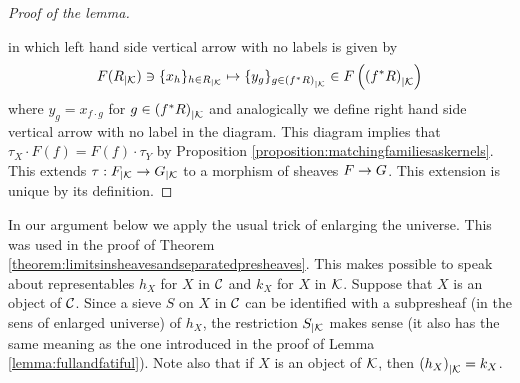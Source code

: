 \begin{proof}[Proof of the lemma]
\begin{center}
\end{center}
in which left hand side vertical arrow with no labels is given by
$$F(R_{\mid {\mathcal K}})\ni \{x_h\}_{h\in R_{\mid {\mathcal K}}}\mapsto \{y_g\}_{g\in \left(f^*R\right)_{\mid {\mathcal K}}} \in F\left(\left(f^*R\right)_{\mid {\mathcal K}}\right)$$
where $y_g = x_{f\cdot g}$ for $g\in \left(f^*R\right)_{\mid {\mathcal K}}$ and analogically we define right hand side vertical arrow with no label in the diagram. This diagram implies that $\tau_X\cdot F(f) = F(f)\cdot \tau_Y$ by Proposition \ref{proposition:matchingfamiliesaskernels}. This extends $\tau:F_{\mid {\mathcal K}}\rightarrow G_{\mid {\mathcal K}}$ to a morphism of sheaves $F\rightarrow G$. This extension is unique by its definition.
\end{proof}
\noindent
In our argument below we apply the usual trick of enlarging the universe. This was used in the proof of Theorem \ref{theorem:limitsinsheavesandseparatedpresheaves}. This makes possible to speak about representables $h_X$ for $X$ in ${\mathcal C}$ and $k_X$ for $X$ in ${\mathcal K}$. Suppose that $X$ is an object of ${\mathcal C}$. Since a sieve $S$ on $X$ in ${\mathcal C}$ can be identified with a subpresheaf (in the sens of enlarged universe) of $h_X$, the restriction $S_{\mid {\mathcal K}}$ makes sense (it also has the same meaning as the one introduced in the proof of Lemma \ref{lemma:fullandfatiful}). Note also that if $X$ is an object of ${\mathcal K}$, then $\left(h_X\right)_{\mid {\mathcal K}} = k_X$. 

